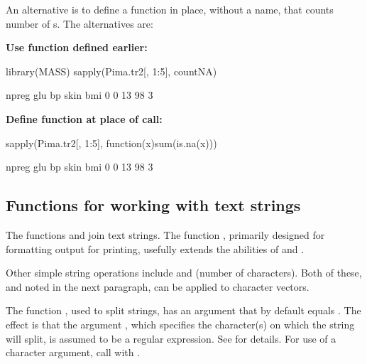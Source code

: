 An alternative is to define a
function
in place, without a name, that counts number of s. The
alternatives are:\\[6pt]
\noindent
\begin{fullwidth}
\begin{minipage}[t]{0.45\linewidth}
  \textbf{Use function defined earlier:}
\begin{Schunk}
\begin{Sinput}
library(MASS)
sapply(Pima.tr2[, 1:5], countNA)
\end{Sinput}
\begin{Soutput}
npreg   glu    bp  skin   bmi 
    0     0    13    98     3 
\end{Soutput}
\end{Schunk}
\end{minipage}
\hspace*{0.02\textwidth}
\begin{minipage}[t]{0.45\linewidth}
\textbf{Define function at place of call:}
\begin{Schunk}
\begin{Sinput}
sapply(Pima.tr2[, 1:5],
       function(x)sum(is.na(x)))
\end{Sinput}
\begin{Soutput}
npreg   glu    bp  skin   bmi 
    0     0    13    98     3 
\end{Soutput}
\end{Schunk}
\end{minipage}
\end{fullwidth}

\subsection{Functions for working with text strings}

The functions   and
   join text strings. The function ,
primarily designed for formatting output for printing,
usefully extends the abilities of  and
  .

Other simple string operations include  and
 (number of characters).  Both of these,
and  noted in the next paragraph, can be
applied to character vectors.

The function , used to split strings, has an argument
 that by default equals .  The effect is that
the argument , which specifies the character(s) on which
the string will split, is assumed to be a regular expression.  See
 for details. For use of a  character
argument, call  with .

